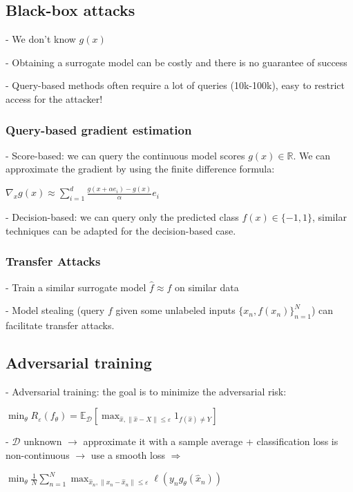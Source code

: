\subsection*{Black-box attacks}

- We don't know $g(x)$

- Obtaining a surrogate model can be costly and there is no guarantee of success

- Query-based methods often require a lot of queries (10k-100k), easy to restrict access for the attacker!

\subsubsection*{Query-based gradient estimation}

- Score-based: we can query the continuous model scores $g(x)\in \mathbb{R}$. We can approximate the gradient by using the finite difference formula:

$\nabla_{x}g(x)\approx\sum_{i=1}^{d}\frac{g(x+\alpha e_{i})-g(x)}{\alpha}e_{i}$

- Decision-based: we can query only the predicted class $f(x) \in \{-1,1\}$, similar techniques can be adapted for the decision-based case.

\subsubsection*{Transfer Attacks}

- Train a similar surrogate model ${\hat{f}}\approx f$ on similar data

- Model stealing (query $f$ given some unlabeled inputs $\{x_{n},f(x_{n})\}_{n=1}^{N}$) can facilitate transfer attacks.


\subsection*{Adversarial training}

- Adversarial training: the goal is to minimize the adversarial risk:

$\operatorname*{min}_{\theta}R_{\varepsilon}(f_{\theta})=\mathbb{E}_{\mathcal{D}}\left[\operatorname*{max}_{\hat{x},\|\hat{x}-X\|\leq\varepsilon}1_{f(\hat{x})\neq Y}\right]$

- $\mathcal{D}$ unknown $\rightarrow$ approximate it with a sample average + classification loss is non-continuous $\rightarrow$ use a smooth loss $\Rightarrow$

$\operatorname*{min}_{\theta}{\frac{1}{N}}\sum_{n=1}^{N} \operatorname*{max}_{\hat{x}_{n},\|x_{n}-\hat{x}_{n}\|\leq\varepsilon}{\ell}(y_{n}g_{\theta}(\hat{x}_{n}))$

